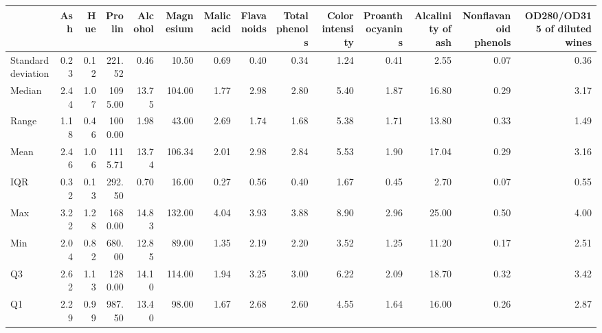 \begin{tabular}{lrrrrrrrrrrrrr}
\toprule
 & Ash & Hue & Prolin & Alcohol & Magnesium & Malic acid & Flavanoids & Total phenols & Color intensity & Proanthocyanins & Alcalinity of ash & Nonflavanoid phenols & OD280/OD315 of diluted wines \\
\midrule
Standard deviation & 0.23 & 0.12 & 221.52 & 0.46 & 10.50 & 0.69 & 0.40 & 0.34 & 1.24 & 0.41 & 2.55 & 0.07 & 0.36 \\
Median & 2.44 & 1.07 & 1095.00 & 13.75 & 104.00 & 1.77 & 2.98 & 2.80 & 5.40 & 1.87 & 16.80 & 0.29 & 3.17 \\
Range & 1.18 & 0.46 & 1000.00 & 1.98 & 43.00 & 2.69 & 1.74 & 1.68 & 5.38 & 1.71 & 13.80 & 0.33 & 1.49 \\
Mean & 2.46 & 1.06 & 1115.71 & 13.74 & 106.34 & 2.01 & 2.98 & 2.84 & 5.53 & 1.90 & 17.04 & 0.29 & 3.16 \\
IQR & 0.32 & 0.13 & 292.50 & 0.70 & 16.00 & 0.27 & 0.56 & 0.40 & 1.67 & 0.45 & 2.70 & 0.07 & 0.55 \\
Max & 3.22 & 1.28 & 1680.00 & 14.83 & 132.00 & 4.04 & 3.93 & 3.88 & 8.90 & 2.96 & 25.00 & 0.50 & 4.00 \\
Min & 2.04 & 0.82 & 680.00 & 12.85 & 89.00 & 1.35 & 2.19 & 2.20 & 3.52 & 1.25 & 11.20 & 0.17 & 2.51 \\
Q3 & 2.62 & 1.13 & 1280.00 & 14.10 & 114.00 & 1.94 & 3.25 & 3.00 & 6.22 & 2.09 & 18.70 & 0.32 & 3.42 \\
Q1 & 2.29 & 0.99 & 987.50 & 13.40 & 98.00 & 1.67 & 2.68 & 2.60 & 4.55 & 1.64 & 16.00 & 0.26 & 2.87 \\
\bottomrule
\end{tabular}
